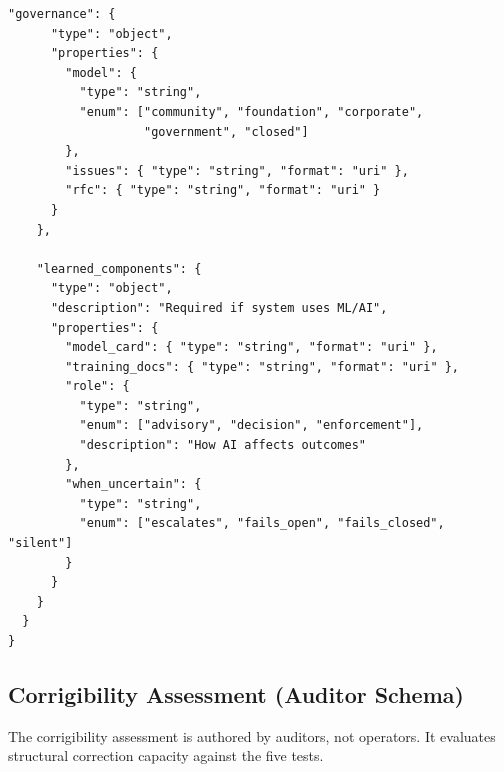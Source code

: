 \documentclass[11pt,a4paper]{article}
\begin{document}
\begin{lstlisting}[style=json]
    "governance": {
      "type": "object",
      "properties": {
        "model": {
          "type": "string",
          "enum": ["community", "foundation", "corporate",
                   "government", "closed"]
        },
        "issues": { "type": "string", "format": "uri" },
        "rfc": { "type": "string", "format": "uri" }
      }
    },

    "learned_components": {
      "type": "object",
      "description": "Required if system uses ML/AI",
      "properties": {
        "model_card": { "type": "string", "format": "uri" },
        "training_docs": { "type": "string", "format": "uri" },
        "role": {
          "type": "string",
          "enum": ["advisory", "decision", "enforcement"],
          "description": "How AI affects outcomes"
        },
        "when_uncertain": {
          "type": "string",
          "enum": ["escalates", "fails_open", "fails_closed", "silent"]
        }
      }
    }
  }
}
\end{lstlisting}

\subsection{Corrigibility Assessment (Auditor Schema)}

The corrigibility assessment is authored by auditors, not operators. It evaluates structural correction capacity against the five tests.
\end{document}
